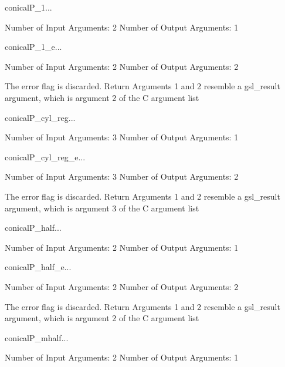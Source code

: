 \begin{funcdesc}{conicalP_1}{...}

    Number of Input  Arguments:  2
    Number of Output Arguments:  1
\end{funcdesc}

\begin{funcdesc}{conicalP_1_e}{...}

    Number of Input  Arguments:  2
    Number of Output Arguments:  2

The error flag is discarded.
Return Arguments 1 and 2 resemble a gsl_result argument,
	which is  argument 2 of the C argument list

\end{funcdesc}

\begin{funcdesc}{conicalP_cyl_reg}{...}

    Number of Input  Arguments:  3
    Number of Output Arguments:  1
\end{funcdesc}

\begin{funcdesc}{conicalP_cyl_reg_e}{...}

    Number of Input  Arguments:  3
    Number of Output Arguments:  2

The error flag is discarded.
Return Arguments 1 and 2 resemble a gsl_result argument,
	which is  argument 3 of the C argument list

\end{funcdesc}

\begin{funcdesc}{conicalP_half}{...}

    Number of Input  Arguments:  2
    Number of Output Arguments:  1
\end{funcdesc}

\begin{funcdesc}{conicalP_half_e}{...}

    Number of Input  Arguments:  2
    Number of Output Arguments:  2

The error flag is discarded.
Return Arguments 1 and 2 resemble a gsl_result argument,
	which is  argument 2 of the C argument list

\end{funcdesc}

\begin{funcdesc}{conicalP_mhalf}{...}

    Number of Input  Arguments:  2
    Number of Output Arguments:  1
\end{funcdesc}


